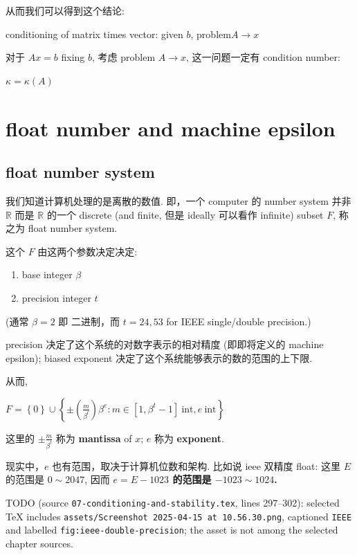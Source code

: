 从而我们可以得到这个结论:

\begin{theorem}{conditioning of matrix times vector: given \(b\),
problem\(A\rightarrow x\)}

对于 \(Ax = b\) fixing \(b\), 考虑 problem \(A\rightarrow x\), 这一问题一定有 condition number:

\(\kappa = \kappa(A)\)

\end{theorem}

\section{float number and machine epsilon}

\subsection{float number system}

我们知道计算机处理的是离散的数值. 即，一个 computer 的 number system 并非 \(\mathbb{R}\) 而是 \(\mathbb{R}\) 的一个 discrete (and finite, 但是 ideally 可以看作 infinite) subset \(F\), 称之为 float number system.

这个 \(F\) 由这两个参数决定决定:

\begin{enumerate}
\tightlist
\item
  base integer \(\beta\)
\item
  precision integer \(t\)
\end{enumerate}

(通常 \(\beta = 2\) 即 二进制，而 \(t = 24,53\) for IEEE single/double precision.)

precision 决定了这个系统的对数字表示的相对精度 (即即将定义的 machine epsilon); biased exponent 决定了这个系统能够表示的数的范围的上下限.

从而,

\(F = \left\{ 0 \right\} \cup \left\{ {\pm \left( \frac{m}{\beta^{t}} \right)\beta^{e}:m \in \left\lbrack {1,\beta^{t} - 1} \right\rbrack\ \text{int},e\ \text{int}} \right\}\)

这里的 \(\pm \frac{m}{\beta^{t}}\) 称为 \textbf{mantissa} of \(x\); \(e\) 称为 \textbf{exponent}.

现实中，\(e\) 也有范围，取决于计算机位数和架构. 比如说 ieee 双精度 float: 这里 \(E\) 的范围是 \(0 \sim 2047\), 因而 \textbf{\(e = E - 1023\) 的范围是 \(- 1023 \sim 1024\).}

TODO (source \texttt{07-conditioning-and-stability.tex}, lines 297--302): selected TeX includes \texttt{assets/Screenshot\ 2025-04-15\ at\ 10.56.30.png}, captioned \texttt{IEEE} and labelled \texttt{fig:ieee-double-precision}; the asset is not among the selected chapter sources.

